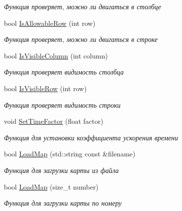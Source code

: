 \begin{DoxyCompactItemize}
\begin{DoxyCompactList}\small\item\em Функция проверяет, можно ли двигаться в столбце \end{DoxyCompactList}\item 
bool \hyperlink{classrtm_1_1_world_controller_a0adbbeed573fe3d987c6db2f14e50d21}{Is\+Allowable\+Row} (int row)
\begin{DoxyCompactList}\small\item\em Функция проверяет, можно ли двигаться в строке \end{DoxyCompactList}\item 
bool \hyperlink{classrtm_1_1_world_controller_aba0f7dc41fd8b38af0864b05e3c59761}{Is\+Visible\+Column} (int column)
\begin{DoxyCompactList}\small\item\em Функция проверяет видимость столбца \end{DoxyCompactList}\item 
bool \hyperlink{classrtm_1_1_world_controller_a146a82552c4043987b96615547f527be}{Is\+Visible\+Row} (int row)
\begin{DoxyCompactList}\small\item\em Функция проверяет видимость строки \end{DoxyCompactList}\item 
void \hyperlink{classrtm_1_1_world_controller_ae06b54bf542fcd9a30945b6d51048f53}{Set\+Time\+Factor} (float factor)
\begin{DoxyCompactList}\small\item\em Функция для установки коэффициента ускорения времени \end{DoxyCompactList}\item 
bool \hyperlink{classrtm_1_1_world_controller_a66ec47d83ef2aa4bc88ef8dd91072491}{Load\+Map} (std\+::string const \&filename)
\begin{DoxyCompactList}\small\item\em Функция для загрузки карты из файла \end{DoxyCompactList}\item 
bool \hyperlink{classrtm_1_1_world_controller_ada6f03eb6808d52ed7fc6af239851ff3}{Load\+Map} (size\+\_\+t number)
\begin{DoxyCompactList}\small\item\em Функция для загрузки карты по номеру \end{DoxyCompactList}\item 
\mbox{\label{classrtm_1_1_world_controller_ae9fbdfd9f1b5a9dafe74c0eb1b3919bc}} 

\end{DoxyCompactItemize}
